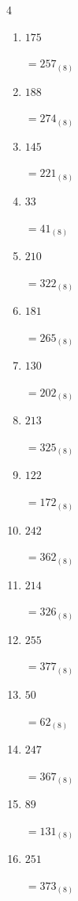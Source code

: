\begin{multicols}{4}
\begin{enumerate}
        $=277_{(8)}$

  \item $175$

        $=257_{(8)}$

  \item $188$

        $=274_{(8)}$

  \item $145$

        $=221_{(8)}$

  \item $33$

        $=41_{(8)}$

\columnbreak %

  \item $210$

        $=322_{(8)}$

  \item $181$

        $=265_{(8)}$

  \item $130$

        $=202_{(8)}$

  \item $213$

        $=325_{(8)}$

  \item $122$

        $=172_{(8)}$

  \item $242$

        $=362_{(8)}$

  \item $214$

        $=326_{(8)}$

  \item $255$

        $=377_{(8)}$

  \item $50$

        $=62_{(8)}$

  \item $247$

        $=367_{(8)}$

  \item $89$

        $=131_{(8)}$

  \item $251$

        $=373_{(8)}$


\end{enumerate}
\end{multicols}
